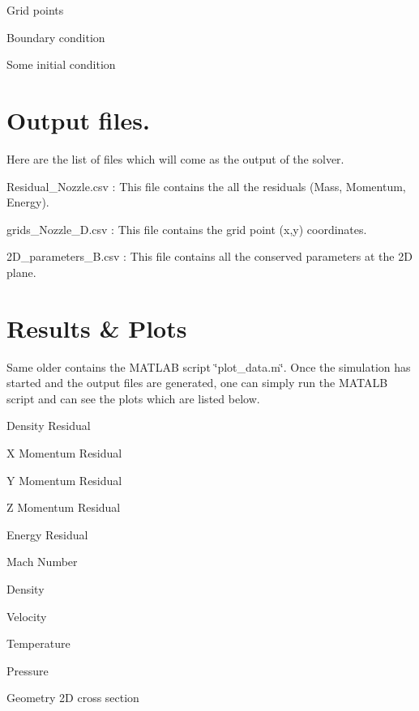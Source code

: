 \begin{DoxyItemize}
\item Grid points
\item Boundary condition
\item Some initial condition 
\end{DoxyItemize}\hypertarget{index_output}{}\section{Output files.}\label{index_output}
Here are the list of files which will come as the output of the solver.
\begin{DoxyItemize}
\item Residual\+\_\+\+Nozzle.\+csv \+: This file contains the all the residuals (Mass, Momentum, Energy).
\item grids\+\_\+\+Nozzle\+\_\+D.\+csv \+: This file contains the grid point (x,y) coordinates.
\item 2\+D\+\_\+parameters\+\_\+\+B.\+csv \+: This file contains all the conserved parameters at the 2D plane. 
\end{DoxyItemize}\hypertarget{index_plot}{}\section{Results \& Plots}\label{index_plot}
Same older contains the M\+A\+T\+L\+AB script \char`\"{}plot\+\_\+data.\+m\char`\"{}. Once the simulation has started and the output files are generated, one can simply run the M\+A\+T\+A\+LB script and can see the plots which are listed below.
\begin{DoxyItemize}
\item Density Residual
\item X Momentum Residual
\item Y Momentum Residual
\item Z Momentum Residual
\item Energy Residual
\item Mach Number
\item Density
\item Velocity
\item Temperature
\item Pressure
\item Geometry 2D cross section 
\end{DoxyItemize}